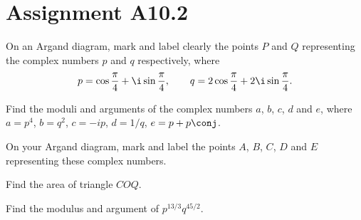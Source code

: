 \section{Assignment A10.2}

\begin{problem}
    On an Argand diagram, mark and label clearly the points $P$ and $Q$ representing the complex numbers $p$ and $q$ respectively, where \[p = \cos\frac\pi4 + \i\sin\frac\pi4, \qquad q = 2\cos\frac\pi4 + 2\i\sin\frac\pi4.\]

    Find the moduli and arguments of the complex numbers $a$, $b$, $c$, $d$ and $e$, where $a = p^4$, $b = q^2$, $c = -ip$, $d = 1/q$, $e = p + p\conj$.

    On your Argand diagram, mark and label the points $A$, $B$, $C$, $D$ and $E$ representing these complex numbers.

    Find the area of triangle $COQ$.

    Find the modulus and argument of $p^{13/3}q^{45/2}$.
\end{problem}

